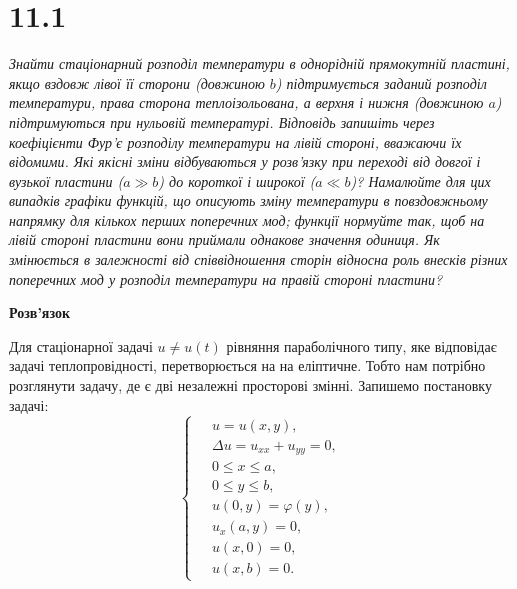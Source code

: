 %
%
%
%
%

\section[Задача №11.1]{11.1}

\textit{Знайти стаціонарний розподіл температури в однорідній прямокутній пластині, якщо вздовж лівої її сторони (довжиною $b$) підтримується заданий розподіл температури, права сторона теплоізольована, а верхня і нижня (довжиною $a$) підтримуються при нульовій температурі. Відповідь запишіть через коефіцієнти Фур’є розподілу температури на лівій стороні, вважаючи їх відомими. Які якісні зміни відбуваються у розв’язку при переході від довгої і вузької пластини ($a \gg b$) до короткої і широкої ($a \ll b$)? Намалюйте для цих випадків графіки функцій, що описують зміну температури в повздовжньому напрямку для кількох перших поперечних мод; функції нормуйте так, щоб на лівій стороні пластини вони приймали однакове значення одиниця. Як змінюється в залежності від співвідношення сторін відносна роль внесків різних поперечних мод у розподіл температури на правій стороні пластини?}

\begin{center}
    \large{\textbf{Розв'язок}}
\end{center}

Для стаціонарної задачі $u \neq u(t)$ рівняння параболічного типу, яке відповідає задачі теплопровідності, перетворюється на на еліптичне. Тобто нам потрібно розглянути задачу, де є дві незалежні просторові змінні. Запишемо постановку задачі:
\begin{equation} \label{cond11,1}
    \left\{ \begin{aligned} 
        \;&u = u(x,y), \\
          &\Delta u = u_{xx} + u_{yy} = 0, \\
          &0 \leq x \leq a,\\ &0 \leq y \leq b, \\
          &u(0,y) = \varphi(y),\\ &u_x(a,y) = 0,\\
          &u(x,0) = 0,\\ &u(x,b) = 0.
    \end{aligned} \right.
\end{equation}

